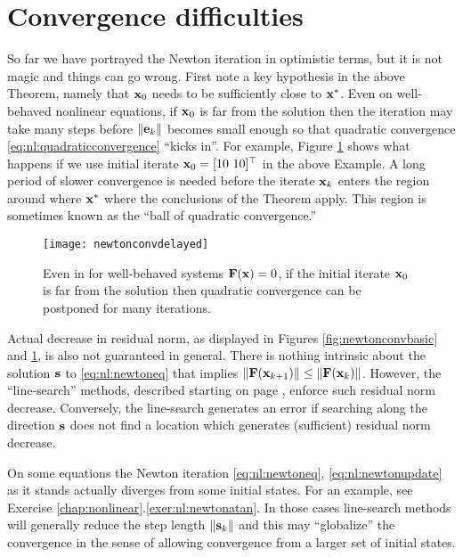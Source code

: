 \section{Convergence difficulties} \label{sec:divergence}

So far we have portrayed the Newton iteration in optimistic terms, but it is not magic and things can go wrong.  First note a key hypothesis in the above Theorem, namely that $\mathbf{x}_0$ needs to be sufficiently close to $\mathbf{x}^*$.  Even on well-behaved nonlinear equations, if $\mathbf{x}_0$ is far from the solution then the iteration may take many steps before $\|\mathbf{e}_k\|$ becomes small enough so that quadratic convergence \eqref{eq:nl:quadraticconvergence} ``kicks in''.  For example, Figure \ref{fig:newtonconvdelayed} shows what happens if we use initial iterate $\mathbf{x}_0=[10\,\, 10]^\top$ in the above Example.  A long period of slower convergence is needed before the iterate $\mathbf{x}_k$ enters the region around where $\mathbf{x}^*$ where the conclusions of the Theorem apply.  This region is sometimes known as the ``ball of quadratic convergence.''

\begin{figure}
\texttt{[image: newtonconvdelayed]}
\caption{Even in for well-behaved systems $\mathbf{F}(\mathbf{x})=0$, if the initial iterate $\mathbf{x}_0$ is far from the solution then quadratic convergence can be postponed for many iterations.}
\label{fig:newtonconvdelayed}
\end{figure}

Actual decrease in residual norm, as displayed in Figures \ref{fig:newtonconvbasic} and \ref{fig:newtonconvdelayed}, is also not guaranteed in general.  There is nothing intrinsic about the solution $\mathbf{s}$ to \eqref{eq:nl:newtoneq} that implies $\|\mathbf{F}(\mathbf{x}_{k+1})\| \le \|\mathbf{F}(\mathbf{x}_k)\|$.  However, the ``line-search'' methods, described starting on page \pageref{sec:linesearch}, enforce such residual norm decrease.  Conversely, the line-search generates an error if searching along the direction $\mathbf{s}$ does not find a location which generates (sufficient) residual norm decrease.

On some equations the Newton iteration \eqref{eq:nl:newtoneq}, \eqref{eq:nl:newtonupdate} as it stands actually diverges from some initial states.  For an example, see Exercise \ref{chap:nonlinear}.\ref{exer:nl:newtonatan}.  In those cases line-search methods will generally reduce the step length $\|\mathbf{s}_k\|$ and this may ``globalize'' the convergence \citep{Kelley2003} in the sense of allowing convergence from a larger set of initial states.

